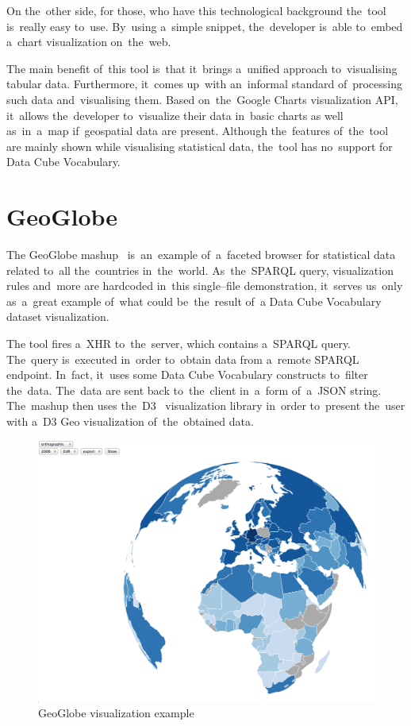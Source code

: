 On the~other side, for those, who have this technological background the~tool is~really easy to~use. By~using a~simple snippet, the~developer is~able to~embed a~chart visualization on~the~web.

The main benefit of~this tool is~that it~brings a~unified approach to~visualising tabular data. Furthermore, it~comes up~with an~informal standard of~processing such data and~visualising them. Based on~the~Google Charts visualization 
API, it~allows the~developer to~visualize their data in~basic charts 
as well as~in~a~map if~geospatial data are present. Although the~features of~the~tool are mainly shown while visualising statistical data, the~tool has no~support for 
Data Cube Vocabulary.

\section{GeoGlobe}
The GeoGlobe mashup~\cite{geoglobe} is~an~example of~a~faceted browser for 
statistical data related to~all the~countries in~the~world. As~the~SPARQL 
query, visualization rules and~more are hardcoded in~this single--file 
demonstration, it~serves us~only as~a~great example of~what could be~the~result of~a
Data Cube Vocabulary dataset visualization.

The tool fires a~XHR to~the~server, which contains a~SPARQL query. The~query is~executed in~order to~obtain data from a~remote SPARQL endpoint. In~fact, it~uses some Data Cube Vocabulary constructs to~filter the~data. The~data 
are sent back to~the~client in~a~form of~a~JSON string. The~mashup then uses the~D3~\cite{d3} visualization library in~order to~present the~user with a~D3 Geo 
visualization of~the~obtained data.

\begin{figure}
	\centering
	\includegraphics[width=140mm]{img/geoglobe.png}
	\caption{GeoGlobe visualization example}
	\label{fig:geoglobe}
\end{figure}


